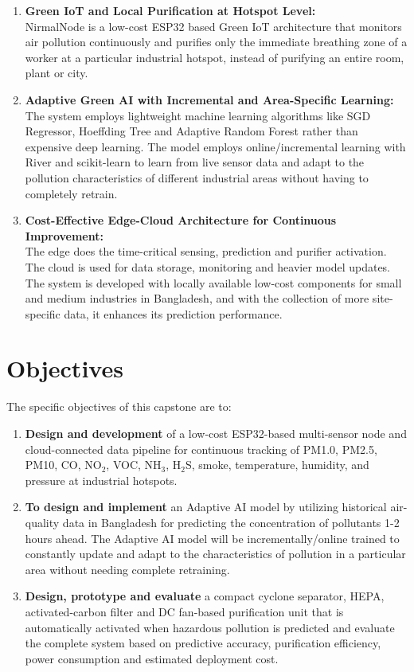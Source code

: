 \begin{enumerate}
    \item \textbf{Green IoT and Local Purification at Hotspot Level:}\\
    NirmalNode is a low-cost ESP32 based Green IoT architecture that monitors air pollution continuously and purifies only the immediate breathing zone of a worker at a particular industrial hotspot, instead of purifying an entire room, plant or city.

    \item \textbf{Adaptive Green AI with Incremental and Area-Specific Learning:}\\
    The system employs lightweight machine learning algorithms like SGD Regressor, Hoeffding Tree and Adaptive Random Forest rather than expensive deep learning. The model employs online/incremental learning with River and scikit-learn to learn from live sensor data and adapt to the pollution characteristics of different industrial areas without having to completely retrain.

    \item \textbf{Cost-Effective Edge-Cloud Architecture for Continuous Improvement:}\\
    The edge does the time-critical sensing, prediction and purifier activation. The cloud is used for data storage, monitoring and heavier model updates. The system is developed with locally available low-cost components for small and medium industries in Bangladesh, and with the collection of more site-specific data, it enhances its prediction performance.
\end{enumerate}

\section{Objectives}
\label{sec:objectives}

The specific objectives of this capstone are to:
\begin{enumerate}
    \item \textbf{Design and development} of a low-cost ESP32-based multi-sensor node and cloud-connected data pipeline for continuous tracking of PM1.0, PM2.5, PM10, CO, NO$_2$, VOC, NH$_3$, H$_2$S, smoke, temperature, humidity, and pressure at industrial hotspots.

    \item \textbf{To design and implement} an Adaptive AI model by utilizing historical air-quality data in Bangladesh for predicting the concentration of pollutants 1-2 hours ahead. The Adaptive AI model will be incrementally/online trained to constantly update and adapt to the characteristics of pollution in a particular area without needing complete retraining.

    \item \textbf {Design, prototype and evaluate} a compact cyclone separator, HEPA, activated-carbon filter and DC fan-based purification unit that is automatically activated when hazardous pollution is predicted and evaluate the complete system based on predictive accuracy, purification efficiency, power consumption and estimated deployment cost.
\end{enumerate}

